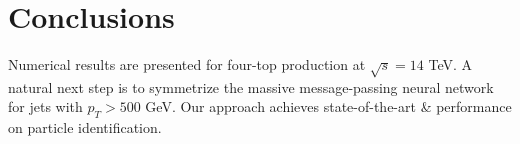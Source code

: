 \section{Conclusions}\label{sec:conclusions}

Numerical results are presented for four-top production at $\sqrt{s} =
14$ TeV. A natural next step is to symmetrize the massive
message-passing neural network for jets with $p_T > 500$ GeV. Our
approach achieves state-of-the-art & performance on particle
identification.


